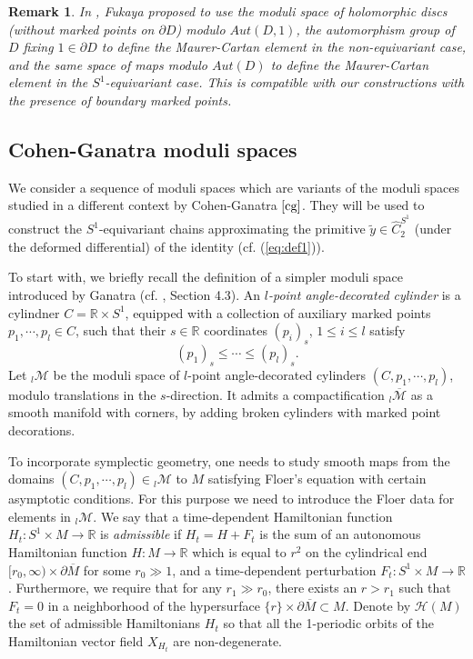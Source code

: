 \documentclass[a4paper]{article}
\newtheorem{remark}[theorem]{Remark}
\numberwithin{equation}{section}
\begin{document}
\begin{remark}
In \cite{kf}, Fukaya proposed to use the moduli space of holomorphic discs (without marked points on $\partial D$) modulo $\mathit{Aut}(D,1)$, the automorphism group of $D$ fixing $1\in\partial D$ to define the Maurer-Cartan element in the non-equivariant case, and the same space of maps modulo $\mathit{Aut}(D)$ to define the Maurer-Cartan element in the $S^1$-equivariant case. This is compatible with our constructions with the presence of boundary marked points.
\end{remark}

\subsection{Cohen-Ganatra moduli spaces}\label{section:CG}

We consider a sequence of moduli spaces which are variants of the moduli spaces studied in a different context by Cohen-Ganatra $\cite{cg}$.  They will be used to construct the $S^1$-equivariant chains approximating the primitive $\tilde{y}\in\widehat{C}_2^{S^1}$ (under the deformed differential) of the identity (cf. (\ref{eq:def1})).

To start with, we briefly recall the definition of a simpler moduli space introduced by Ganatra (cf. \cite{sg1}, Section 4.3). An \textit{$l$-point angle-decorated cylinder} is a cylindner $C=\mathbb{R}\times S^1$, equipped with a collection of auxiliary marked points $p_1,\cdots,p_l\in C$, such that their $s\in\mathbb{R}$ coordinates $(p_i)_s$, $1\leq i\leq l$ satisfy
\begin{equation}
(p_1)_s\leq\cdots\leq(p_l)_s.
\end{equation}
Let ${}_l\mathcal{M}$ be the moduli space of $l$-point angle-decorated cylinders $(C,p_1,\cdots,p_l)$, modulo translations in the $s$-direction. It admits a compactification ${}_l\overline{\mathcal{M}}$ as a smooth manifold with corners, by adding broken cylinders with marked point decorations.

To incorporate symplectic geometry, one needs to study smooth maps from the domains $(C,p_1,\cdots,p_l)\in{}_l\mathcal{M}$ to $M$ satisfying Floer's equation with certain asymptotic conditions. For this purpose we need to introduce the Floer data for elements in ${}_l\mathcal{M}$. We say that a time-dependent Hamiltonian function $H_t:S^1\times M\rightarrow\mathbb{R}$ is \textit{admissible} if $H_t=H+F_t$ is the sum of an autonomous Hamiltonian function $H:M\rightarrow\mathbb{R}$ which is equal to $r^2$ on the cylindrical end $[r_0,\infty)\times\partial\overline{M}$ for some $r_0\gg1$, and a time-dependent perturbation $F_t:S^1\times M\rightarrow\mathbb{R}$. Furthermore, we require that for any $r_1\gg r_0$, there exists an $r>r_1$ such that $F_t=0$ in a neighborhood of the hypersurface $\{r\}\times\partial\overline{M}\subset M$. Denote by $\mathcal{H}(M)$ the set of admissible Hamiltonians $H_t$ so that all the 1-periodic orbits of the Hamiltonian vector field $X_{H_t}$ are non-degenerate.
\end{document}
